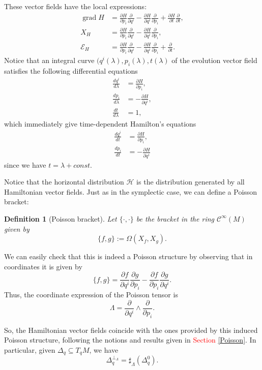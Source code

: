 \documentclass[12pt]{article}
\newtheorem{Def}{Definition}[section]
\newcommand{\grad}{\operatorname{grad}}
\newcommand{\partder}[2]{\frac{\partial #1}{\partial #2}}
\newcommand{\totder}[2]{\frac{d #1}{d #2}}
\begin{document}
These vector fields have the local expressions:
\begin{align*}
\grad H &= \partder{H}{p_i} \partder{}{q^i} - \partder{H}{q^i} \partder{}{p_i} + \partder{H}{t} \partder{}{t},\\
X_H &=  \partder{H}{p_i} \partder{}{q^i} - \partder{H}{q^i} \partder{}{p_i}, \\
\mathcal{E}_H &=  \partder{H}{p_i} \partder{}{q^i} - \partder{H}{q^i} \partder{}{p_i} + \partder{}{t}.
\end{align*}
Notice that an integral curve $(q^i(\lambda), p_i(\lambda), t(\lambda)$ of the evolution vector field satisfies the following differential equations
\begin{align*}
    \totder{q^i}{ \lambda} &= \partder{H}{p_i},\\
    \totder{p_i}{\lambda} &= -\partder{H}{q^i},\\
    \totder{t}{\lambda} &= 1,
\end{align*}
which immediately give time-dependent Hamilton's equations
\begin{align*}
    \totder{q^i}{t} &= \partder{H}{p_i},\\
    \totder{p_i}{t} &= -\partder{H}{q^i}
\end{align*}
since we have $t=\lambda+const.$

Notice that the horizontal distribution $\mathcal{H}$ is the distribution generated by all Hamiltonian vector fields. Just as in the symplectic case, we can define a Poisson bracket:\\

\begin{Def}[Poisson bracket]Let $\{\cdot, \cdot \}$ be the bracket in the
ring $\mathcal{C}^{\infty}(M)$ given by $$\{f,g\} := \Omega(X_f,X_g).$$ \end{Def} 

We can easily check that this is indeed a Poisson structure by observing that in coordinates it is given by $$\{f,g\} = \frac{\partial f}{\partial q^i}\frac{\partial g}{\partial p_i}- \frac{\partial f}{\partial p_i} \frac{\partial g}{\partial q^i}.$$ Thus, the coordinate expression of the Poisson tensor is $$\Lambda = \frac{\partial}{\partial q^i} \wedge \frac{\partial}{\partial p_i}.$$

 So, the Hamiltonian vector fields coincide with the ones provided by this induced Poisson structure, following the notions and results given in \textcolor{red}{Section \ref{Poisson}}. In particular, given $\Delta_q \subseteq T_qM$,  we have $$\Delta_q^{\perp_\Lambda} = \sharp_{\Lambda}(\Delta_q^0).$$
\end{document}
